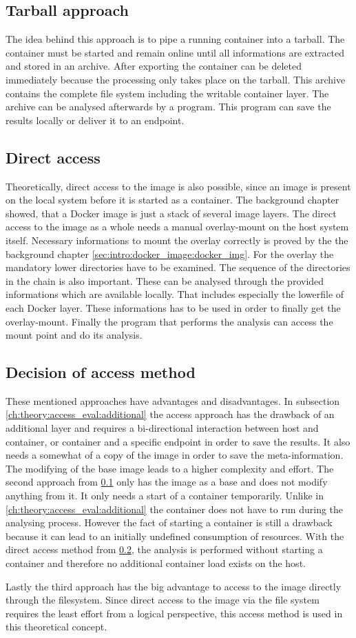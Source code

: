 \subsection{Tarball approach} 
\label{ch:theory:access_eval:tarball}
The idea behind this approach is to pipe a running container into a tarball. The container must be started and remain online until all informations are extracted and stored in an archive.
After exporting the container can be deleted immediately because the processing only takes place on the tarball.
This archive contains the complete file system including the writable container layer. The archive can be analysed afterwards by a program. This program can save the results locally or deliver it to an endpoint.

\subsection{Direct access} 
\label{ch:theory:access_eval:direct_access}
Theoretically, direct access to the image is also possible, since an image is present on the local system before it is started as a container.
The background chapter showed, that a Docker image is just a stack of several image layers. The direct access to the image as a whole needs a manual overlay-mount on the host system itself.
Necessary informations to mount the overlay correctly is proved by the the background chapter \ref{sec:intro:docker_image:docker_img}.
For the overlay the mandatory lower directories have to be examined. The sequence of the directories in the chain is also important. These can be analysed through the provided informations which are available locally. That includes especially the lowerfile of each Docker layer. These informations has to be used in order to finally get the overlay-mount. 
Finally the program that performs the analysis can access the mount point and do its analysis. 

\subsection{Decision of access method} 
\label{ch:theory:access_eval:decision_access}
These mentioned approaches have advantages and disadvantages. 	
In subsection \ref{ch:theory:access_eval:additional} the access approach has the drawback of an additional layer and requires a bi-directional interaction between host and container, or container and a specific endpoint in order to save the results. It also needs a somewhat of a copy of the image in order to save the meta-information. The modifying of the base image leads to a higher complexity and effort. 
The second approach from \ref{ch:theory:access_eval:tarball} only has the image as a base and does not modify anything from it. It only needs a start of a container temporarily. Unlike in \ref{ch:theory:access_eval:additional} the container does not have to run during the analysing process. However the fact of starting a container is still a drawback because it can lead to an initially undefined consumption of resources.
With the direct access method from \ref{ch:theory:access_eval:direct_access}, the analysis is performed without starting a container and therefore no additional container load exists on the host.

Lastly the third approach has the big advantage to access to the image directly through the filesystem. 
Since direct access to the image via the file system requires the least effort from a logical perspective, this access method is used in this theoretical concept.